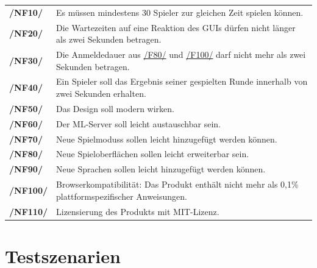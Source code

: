\documentclass[a4paper]{scrreprt}
\begin{document}
    \begin{tabularx}{\linewidth}{@{}>{\bfseries}l@{\hspace{.5em}}X@{}}
        /NF10/ & Es müssen mindestens 30 \Gls{Spieler} zur gleichen Zeit spielen können.\\
        /NF20/ & Die Wartezeiten auf eine Reaktion des GUIs dürfen nicht länger als zwei Sekunden betragen. \\
	    /NF30/ & Die Anmeldedauer aus \hyperlink{F80}{/F80/} und \hyperlink{F100}{/F100/} darf nicht mehr als zwei Sekunden betragen. \\
        /NF40/ & Ein \Gls{Spieler} soll das Ergebnis seiner gespielten Runde innerhalb von zwei Sekunden erhalten. \\
        /NF50/ & Das Design soll modern wirken. \\
        /NF60/ & Der \Gls{ML-Server} soll leicht austauschbar sein. \\
        /NF70/ & Neue \Glspl{Spielmodus} sollen leicht hinzugefügt werden können. \\
        /NF80/ & Neue Spieloberflächen sollen leicht erweiterbar sein. \\
        /NF90/ & Neue Sprachen sollen leicht hinzugefügt werden können. \\
        /NF100/ & Browserkompatibilität: Das \Gls{Produkt} enthält nicht mehr als 0,1\% plattformspezifischer Anweisungen. \\
        /NF110/ & Lizensierung des \Gls{Produkt}s mit MIT-Lizenz.
    \end{tabularx}

    \chapter{Testszenarien}
\end{document}
